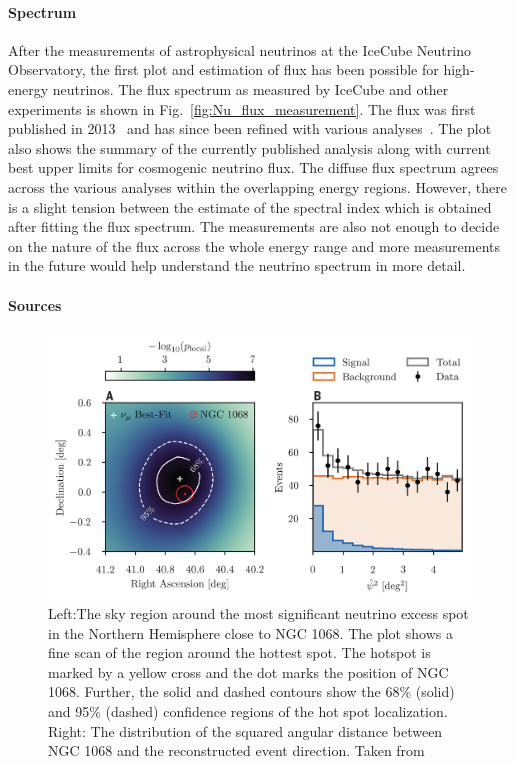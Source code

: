   \paragraph*{Spectrum}
  \label{subsubsec:Nuspectrum}
  After the measurements of astrophysical neutrinos at the IceCube Neutrino Observatory, the first plot and estimation of flux has been possible for high-energy neutrinos. The flux spectrum as measured by IceCube and other experiments is shown in Fig.~\ref{fig:Nu_flux_measurement}. The flux was first published in 2013~\cite{Aartsen_2014_first_flux} and has since been refined with various analyses~\cite{PhysRevD.110.022001}. The plot also shows the summary of the currently published analysis along with current best upper limits for cosmogenic neutrino flux. The diffuse flux spectrum agrees across the various analyses within the overlapping energy regions. However, there is a slight tension between the estimate of the spectral index which is obtained after fitting the flux spectrum. The measurements are also not enough to decide on the nature of the flux across the whole energy range and more measurements in the future would help understand the neutrino spectrum in more detail. 

  \paragraph*{Sources}
  \label{subsubsec:Nusources}
  \begin{figure}[t!]
    \centering
    \includegraphics[width=14.5cm]{thesis_figures/CRnNu/science-abg3395-f2.jpg}
    \caption{Left:The sky region around the most significant neutrino excess spot in the Northern Hemisphere close to NGC 1068. The plot shows a fine scan of the region around the hottest spot. The hotspot is marked by a yellow cross and the dot marks the position of NGC 1068. Further, 
    the solid and dashed contours show the 68\% (solid) and 95\% (dashed) confidence regions of
    the hot spot localization. Right: The distribution of the squared angular distance between NGC 1068 and the reconstructed event direction. Taken from~\cite{Icecube_2022}}
    \label{fig:NGC1068_excess}
  \end{figure}

